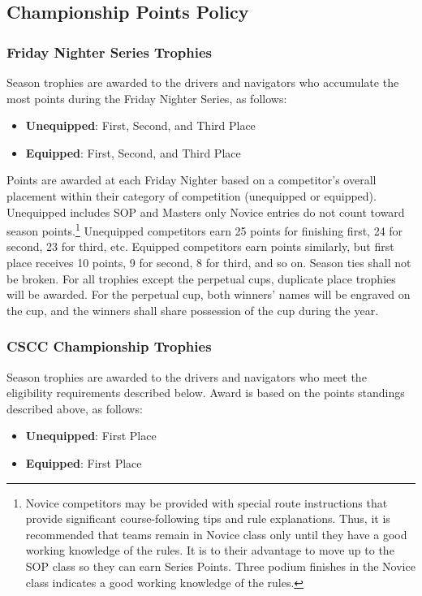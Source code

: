 \subsection{Championship Points Policy}
\subsubsection{Friday Nighter Series Trophies}
Season trophies are awarded to the drivers and navigators who accumulate the most points during the Friday Nighter Series, as follows:
\begin{itemize}
\item \textbf{Unequipped}: First, Second, and Third Place
\item \textbf{Equipped}: First, Second, and Third Place
\end{itemize}

\clearpage

Points are awarded at each Friday Nighter based on a competitor's overall placement within their category of competition (unequipped or equipped). Unequipped includes SOP and Masters only Novice entries do not count toward season points.\footnote{Novice competitors may be provided with special route instructions that provide significant course-following tips and rule explanations. Thus, it is recommended that teams remain in Novice class only until they have a good working knowledge of the rules. It is to their advantage to move up to the SOP class so they can earn Series Points. Three podium finishes in the Novice class indicates a good working knowledge of the rules.} Unequipped competitors earn 25 points for finishing first, 24 for second, 23 for third, etc. Equipped competitors earn points similarly, but first place receives 10 points, 9 for second, 8 for third, and so on. Season ties shall not be broken. For all trophies except the perpetual cups, duplicate place trophies will be awarded. For the perpetual cup, both winners' names will be engraved on the cup, and the winners shall share possession of the cup during the year.

\subsubsection{CSCC Championship Trophies}
Season trophies are awarded to the drivers and navigators who meet the eligibility requirements described below. Award is based on the points standings described above, as follows:
\begin{itemize}
\item \textbf{Unequipped}: First Place
\item \textbf{Equipped}: First Place
\end{itemize}

